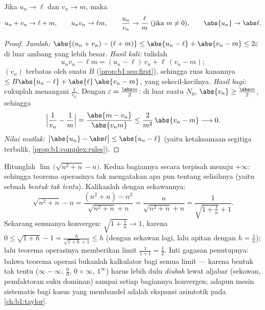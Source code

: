 \begin{theorem}\label{thm:b1:seq:operations}
Jika $u_n \to \ell$ dan $v_n \to m$, maka
\[
u_n + v_n \to \ell + m, \qquad u_n v_n \to \ell m, \qquad
\frac{u_n}{v_n} \to \frac{\ell}{m} \ (\text{jika } m \neq 0),
\qquad \abs{u_n} \to \abs\ell .
\]
\end{theorem}

\begin{proof}
\emph{Jumlah:} $\abs{(u_n + v_n) - (\ell + m)} \leq \abs{u_n - \ell} +
\abs{v_n - m} \leq 2\varepsilon$ di luar ambang yang lebih besar.
\emph{Hasil kali:} tulislah
\[
u_n v_n - \ell m = (u_n - \ell)\,v_n + \ell\,(v_n - m);
\]
$(v_n)$ terbatas oleh suatu $B$ (\cref{prop:b1:seq:first}), sehingga
ruas kanannya $\leq B\abs{u_n - \ell} + \abs{\ell}\,\abs{v_n - m}$,
yang sekecil-kecilnya. \emph{Hasil bagi:} cukuplah menangani $\frac
1{v_n}$. Dengan $\varepsilon = \frac{\abs m}{2}$: di luar suatu $N_0$,
$\abs{v_n} \geq \frac{\abs m}{2}$, sehingga
\[
\Bigl| \frac{1}{v_n} - \frac 1m \Bigr|
= \frac{\abs{m - v_n}}{\abs{v_n m}}
\leq \frac{2}{m^2}\,\abs{v_n - m} \longrightarrow 0 .
\]
\emph{Nilai mutlak:} $\bigl|\abs{u_n} - \abs\ell\bigr| \leq
\abs{u_n - \ell}$ (yaitu ketaksamaan segitiga terbalik,
\cref{prop:b1:complex:rules}).
\end{proof}

\begin{example}\label{ex:b1:seq:conjugatetrick}
Hitunglah $\lim\,\bigl(\sqrt{n^2 + n} - n\bigr)$. Kedua bagiannya
secara terpisah menuju $+\infty$: sehingga teorema operasinya tak mengatakan apa pun
tentang selisihnya (yaitu sebuah \emph{bentuk tak tentu}). Kalikanlah
dengan sekawannya:
\[
\sqrt{n^2 + n} - n
= \frac{(n^2 + n) - n^2}{\sqrt{n^2 + n} + n}
= \frac{n}{\sqrt{n^2+n} + n}
= \frac{1}{\sqrt{1 + \frac1n} + 1} .
\]
Sekarang semuanya konvergen: $\sqrt{1 + \frac1n} \to 1$, karena
$0 \leq \sqrt{1 + h} - 1 = \frac{h}{\sqrt{1+h} + 1} \leq h$
(dengan sekawan lagi, lalu apitan dengan $h = \frac1n$); lalu
teorema operasinya memberikan limit $\frac{1}{1 + 1} =
\frac12$. Inti gagasan penutupnya: bahwa teorema operasi bukanlah
kalkulator bagi semua limit --- karena bentuk tak tentu ($\infty -
\infty$, $\frac00$, $0 \times \infty$, $1^\infty$) harus lebih dulu
\emph{diubah} lewat aljabar (sekawan, pemfaktoran suku
dominan) sampai setiap bagiannya konvergen; adapun mesin sistematis bagi
kasus yang membandel adalah ekspansi asimtotik pada
\cref{ch:b1:taylor}.
\end{example}

